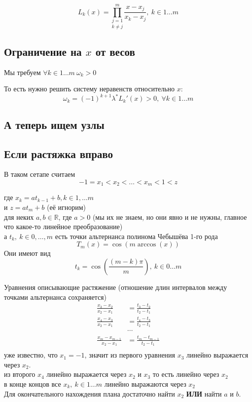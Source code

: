 \documentclass[12pt,a4paper]{article}
\begin{document}
	\[
	L_k(x) = \underset{k \neq j}{\prod_{j=1}^{m}} \frac{x - x_j}{x_k - x_j}, \ k \in 1 \ldots m
	\]
	
	\subsection{Ограничение на $x$ от весов}
	
	Мы требуем $\forall k \in 1 \ldots m \ \omega_k > 0 $
	
	\noindent То есть нужно решить систему неравенств относительно $x$:
	\[
	\omega_k  = (-1)^{k+1} \lambda^* L_k'(x) > 0 , \ \forall k \in 1 \ldots m 
	\]
	
	\newpage
	\subsection{А теперь ищем узлы}
	
	\subsection*{Если растяжка вправо}
	
	\noindent В таком сетапе считаем
	\[
	    -1 = x_1 < x_2 < \ldots < x_m < 1 < z
	\]
	
	\noindent где $x_k = a t_{k-1} + b, k \in 1, \ldots m$ \\
	и $z=a t_m + b$ (её игнорим)\\
	для неких $a, b \in \mathbb{R}$, где $a > 0$ (мы их не знаем, но они явно и не нужны, главное что какое-то линейное преобразование) \\
	а $t_k, \  k \in 0, \ldots, m$ есть точки альтернанса полинома Чебышёва 1-го рода 
	\[
	T_{m}(x) = \cos( m \arccos(x))
	\]
	\noindent Они имеют вид 
	\[
	t_k = \cos \left( \frac{ (m-k) \pi}{m} \right), \ k \in 0 \ldots m
	\]
	
	\noindent Уравнения описывающие растяжение (отношение длин интервалов между точками альтернанса сохраняется)
	\begin{align*}
		\frac{x_3 - x_2}{x_2 - x_1} &= \frac{t_3 - t_2}{t_2 - t_1}\\ 
		\frac{x_4 - x_3}{x_2 - x_1} &= \frac{t_4 - t_3}{t_2 - t_1}\\
		&\cdots\\
		\frac{x_m - x_{m-1}}{x_2 - x_1} &= \frac{t_m - t_{m-1}}{t_2 - t_1}\\
	\end{align*}
	\noindent уже известно, что $x_1 = -1$, значит из первого уравнения $x_3$ линейно выражается через $x_2$.\\
	из второго $x_4$ линейно выражается через $x_2$ и $x_3$ то есть линейно через $x_2$\\
	в конце концов все $x_k, \ k \in 1 \ldots m $ линейно выражаются через $x_2$\\
	Для окончательного нахождения плана достаточно найти $x_2$ 
	\textbf{ИЛИ} найти $a$ и $b$.\\
	
\end{document}
